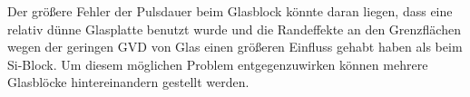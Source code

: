 Der größere Fehler der Pulsdauer beim Glasblock könnte daran liegen, dass eine relativ dünne Glasplatte benutzt wurde und die Randeffekte an den Grenzflächen wegen der geringen GVD von Glas einen größeren Einfluss gehabt haben als beim Si-Block.
Um diesem möglichen Problem entgegenzuwirken können mehrere Glasblöcke hintereinandern gestellt werden.


